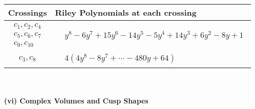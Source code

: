 \documentclass[1p]{elsarticle_modified}
\theoremstyle{definition}
\begin{document}
\begin{tabular}{m{50pt}|m{274pt}}
Crossings & \hspace{64pt}Riley Polynomials at each crossing \\
\hline $$\begin{aligned}c_{1},c_{2},c_{4}\\c_{5},c_{6},c_{7}\\c_{9},c_{10}\end{aligned}$$&$\begin{aligned}
&y^8-6 y^7+15 y^6-14 y^5-5 y^4+14 y^3+6 y^2-8 y+1
\end{aligned}$\\
\hline $$\begin{aligned}c_{3},c_{8}\end{aligned}$$&$\begin{aligned}
&4(4 y^8-8 y^7+\cdots-480 y+64)
\end{aligned}$\\
\hline
\end{tabular}\\~\\
\newpage\flushleft \textbf{(vi) Complex Volumes and Cusp Shapes}
\end{document}
